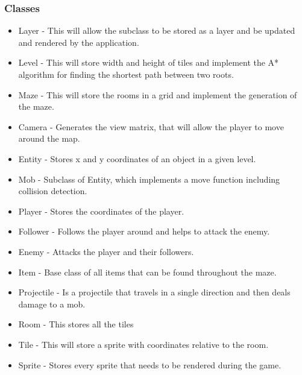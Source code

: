 \documentclass{article}
\begin{document}
            \subsubsection{Classes}
                \begin{itemize}
                    \item Layer - This will allow the subclass to be stored as a layer and be updated and rendered by the application.
                    \item Level - This will store width and height of tiles and implement the A* algorithm for finding the shortest path between two roots.
                    \item Maze - This will store the rooms in a grid and implement the generation of the maze.
                    \item Camera - Generates the view matrix, that will allow the player to move around the map.
                    \item Entity - Stores x and y coordinates of an object in a given level.
                    \item Mob - Subclass of Entity, which implements a move function including collision detection.
                    \item Player - Stores the coordinates of the player.
                    \item Follower - Follows the player around and helps to attack the enemy.
                    \item Enemy - Attacks the player and their followers.
                    \item Item - Base class of all items that can be found throughout the maze.
                    \item Projectile - Is a projectile that travels in a single direction and then deals damage to a mob.
                    \item Room - This stores all the tiles
                    \item Tile - This will store a sprite with coordinates relative to the room.
                    \item Sprite - Stores every sprite that needs to be rendered during the game.
                \end{itemize}
\end{document}
